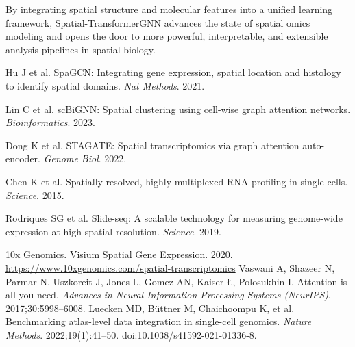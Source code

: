 \documentclass[unnumsec,webpdf,contemporary,medium]{oup-authoring-template}
\begin{document}
By integrating spatial structure and molecular features into a unified learning framework, Spatial-TransformerGNN advances the state of spatial omics modeling and opens the door to more powerful, interpretable, and extensible analysis pipelines in spatial biology.


\begin{thebibliography}{9}

Hu J et al. SpaGCN: Integrating gene expression, spatial location and histology to identify spatial domains. \textit{Nat Methods}. 2021.

Lin C et al. scBiGNN: Spatial clustering using cell-wise graph attention networks. \textit{Bioinformatics}. 2023.

Dong K et al. STAGATE: Spatial transcriptomics via graph attention auto-encoder. \textit{Genome Biol}. 2022.

Chen K et al. Spatially resolved, highly multiplexed RNA profiling in single cells. \textit{Science}. 2015.

Rodriques SG et al. Slide-seq: A scalable technology for measuring genome-wide expression at high spatial resolution. \textit{Science}. 2019.

10x Genomics. Visium Spatial Gene Expression. 2020. \url{https://www.10xgenomics.com/spatial-transcriptomics}
Vaswani A, Shazeer N, Parmar N, Uszkoreit J, Jones L, Gomez AN, Kaiser Ł, Polosukhin I. Attention is all you need. \textit{Advances in Neural Information Processing Systems (NeurIPS)}. 2017;30:5998–6008.
Luecken MD, Büttner M, Chaichoompu K, et al. Benchmarking atlas-level data integration in single-cell genomics. \textit{Nature Methods}. 2022;19(1):41–50. doi:10.1038/s41592-021-01336-8.
\end{thebibliography}
\end{document}
